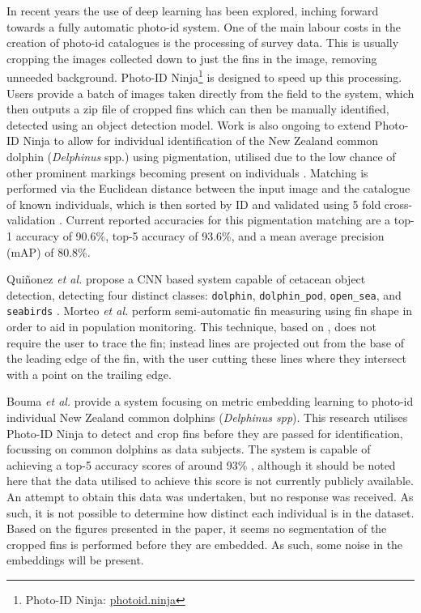 In recent years the use of deep learning has been explored, inching forward towards a fully automatic photo-id system. One of the main labour costs in the creation of photo-id catalogues is the processing of survey data. This is usually cropping the images collected down to just the fins in the image, removing unneeded background. Photo-ID Ninja\footnote{\label{footnote:photo-idNinja}Photo-ID Ninja: \href{http://photoid.ninja}{photoid.ninja}} is designed to speed up this processing. Users provide a batch of images taken directly from the field to the system, which then outputs a zip file of cropped fins which can then be manually identified, detected using an object detection model.  Work is also ongoing to extend Photo-ID Ninja to allow for individual identification of the New Zealand common dolphin (\textit{Delphinus} spp.) using pigmentation, utilised due to the low chance of other prominent markings becoming present on individuals \cite{gilman_computer-assisted_2016}. Matching is performed via the Euclidean distance between the input image and the catalogue of known individuals, which is then sorted by ID and validated using 5 fold cross-validation \cite{bouma_individual_2018}. Current reported accuracies for this pigmentation matching are a top-1 accuracy of 90.6\%, top-5 accuracy of 93.6\%, and a mean average precision (mAP) of 80.8\%.

Qui\~{n}onez \textit{et al.} propose a CNN based system capable of cetacean object detection, detecting four distinct classes: \texttt{dolphin}, \texttt{dolphin\_pod}, \texttt{open\_sea}, and \texttt{seabirds} \cite{quinonez_using_2019}. Morteo \textit{et al.} \cite{morteo_phenotypic_2017} perform semi-automatic fin measuring using fin shape in order to aid in population monitoring. This technique, based on \cite{weller_global_1998}, does not require the user to trace the fin; instead lines are projected out from the base of the leading edge of the fin, with the user cutting these lines where they intersect with a point on the trailing edge. 

Bouma \textit{et al.} provide a system focusing on metric embedding learning to photo-id individual New Zealand common dolphins (\textit{Delphinus spp}). This research utilises Photo-ID Ninja to detect and crop fins before they are passed for identification, focussing on common dolphins as data subjects. The system is capable of achieving a top-5 accuracy scores of around 93\% \cite{bouma_individual_2018}, although it should be noted here that the data utilised to achieve this score is not currently publicly available. An attempt to obtain this data was undertaken, but no response was received. As such, it is not possible to determine how distinct each individual is in the dataset. Based on the figures presented in the paper, it seems no segmentation of the cropped fins is performed before they are embedded. As such, some noise in the embeddings will be present. 

